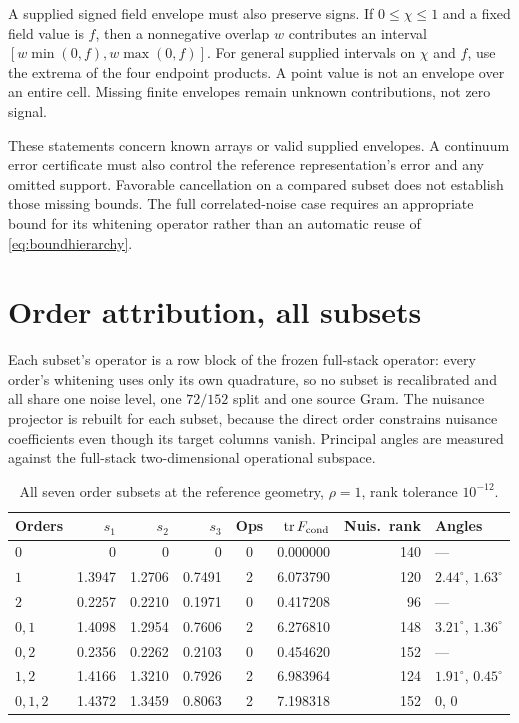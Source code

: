 A supplied signed field envelope must also preserve signs. If $0\leq\chi\leq1$ and a fixed field value is $f$, then a nonnegative overlap $w$ contributes an interval $[w\min(0,f),w\max(0,f)]$. For general supplied intervals on $\chi$ and $f$, use the extrema of the four endpoint products. A point value is not an envelope over an entire cell. Missing finite envelopes remain unknown contributions, not zero signal.

These statements concern known arrays or valid supplied envelopes. A continuum error certificate must also control the reference representation's error and any omitted support. Favorable cancellation on a compared subset does not establish those missing bounds. The full correlated-noise case requires an appropriate bound for its whitening operator rather than an automatic reuse of \eqref{eq:boundhierarchy}.

\Needspace{0.82\textheight}
\section{Order attribution, all subsets}\label{app:orderattr}
Each subset's operator is a row block of the frozen full-stack operator: every
order's whitening uses only its own quadrature, so no subset is recalibrated
and all share one noise level, one $72/152$ split and one source Gram. The
nuisance projector is rebuilt for each subset, because the direct order
constrains nuisance coefficients even though its target columns vanish.
Principal angles are measured against the full-stack two-dimensional
operational subspace.

\begin{table}[htbp]
\centering\small
\caption{All seven order subsets at the reference geometry, $\rho=1$, rank
tolerance $10^{-12}$.}
\label{tab:orderattr:full}
\begin{tabular}{l r r r c r r l}
\toprule
Orders&$s_1$&$s_2$&$s_3$&Ops&$\operatorname{tr} F_{\rm cond}$&Nuis.\ rank&Angles\\
\midrule
$0$&0&0&0&0&0.000000&140&---\\
$1$&1.3947&1.2706&0.7491&2&6.073790&120&$2.44^\circ$, $1.63^\circ$\\
$2$&0.2257&0.2210&0.1971&0&0.417208&96&---\\
$0,1$&1.4098&1.2954&0.7606&2&6.276810&148&$3.21^\circ$, $1.36^\circ$\\
$0,2$&0.2356&0.2262&0.2103&0&0.454620&152&---\\
$1,2$&1.4166&1.3210&0.7926&2&6.983964&124&$1.91^\circ$, $0.45^\circ$\\
$0,1,2$&1.4372&1.3459&0.8063&2&7.198318&152&$0$, $0$\\
\bottomrule
\end{tabular}
\end{table}

